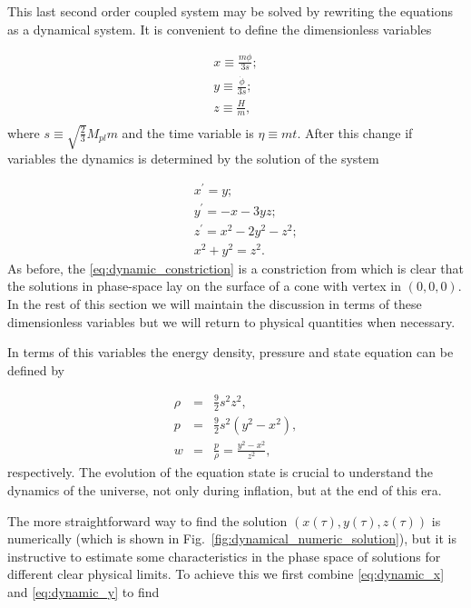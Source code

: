 \documentclass[12pt,letterpaper,twoside]{book}
\newcommand\etcomment[1]{\MakeUppercase{\mytexttt{\textcolor{blue}{#1}}}}
\begin{document}
This last second order coupled system may be solved by rewriting the equations
as a dynamical system. It is convenient to define the dimensionless variables

\begin{eqnarray}
    x  \equiv  \frac{m\phi}{3s};      \\
    y  \equiv  \frac{\dot{\phi}}{3s}; \\
    z  \equiv  \frac{H}{m},           \\
\end{eqnarray}
where $s \equiv \sqrt{\frac{2}{3}} M_{pl} m$ and the time variable is $\eta
\equiv mt$\etcomment{Here this eta time may be confused with the slow roll
    parameter!}. After this change if variables the dynamics is determined by
the solution of the system

\begin{eqnarray}
    && x^\prime =  y;              \label{eq:dynamic_x}\\
    && y^\prime = -x -3yz;         \label{eq:dynamic_y}\\
    && z^\prime =  x^2 -2y^2 -z^2; \label{eq:dynamic_z}\\
    && x^2 +y^2 =  z^2.            \label{eq:dynamic_constriction}
\end{eqnarray}
As before, the \eqref{eq:dynamic_constriction} is a constriction from which is
clear that the solutions  in phase-space lay on the surface of a cone with
vertex in $(0,0,0)$.  In the rest of this section we will maintain the
discussion in terms of these dimensionless variables but we will return to
physical quantities when necessary.

In terms of this variables the energy density, pressure and state equation can
be defined by

\begin{eqnarray}
    \rho & = & \frac{9}{2} s^2 z^2,\\
     p   & = & \frac{9}{2} s^2 \left(y^2 -x^2\right),\\
     w   & = & \frac{p}{\rho}= \frac{y^2 - x^2}{z^2},
\end{eqnarray}
respectively. The evolution of the equation state is crucial to understand the
dynamics of the universe, not only during inflation, but at the end of this era.

The more straightforward  way to find the solution $(x(\tau), y(\tau), z(\tau))$
is numerically (which is shown in Fig.~\ref{fig:dynamical_numeric_solution}),
but it is instructive to estimate some characteristics in the phase space of
solutions for different clear physical limits.  To achieve this we first combine
\eqref{eq:dynamic_x} and \eqref{eq:dynamic_y} to find
\end{document}

